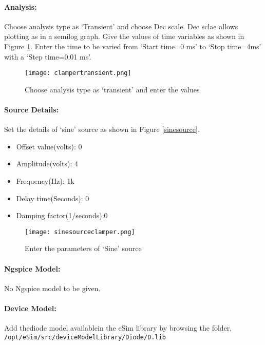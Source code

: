 %

\paragraph{Analysis:}Choose analysis type as `Transient' and choose Dec scale. Dec sclae allows plotting as in a semilog graph.  Give the values of time variables as shown in Figure \ref{clampertransient}. Enter the time to be varied from `Start time=0 ms' to `Stop time=4ms' with a `Step time=0.01 ms'.

\begin{figure}[h]
\centering
\texttt{[image: clampertransient.png]}
\caption{Choose analysis type as `transient' and enter the values}
\label{clampertransient}
\end{figure}

\paragraph{Source Details:} Set the details of `sine' source as shown in Figure \ref{sinesource}.
\begin{itemize}
\item
Offset value(volts): 0
\item
Amplitude(volts): 4
\item
Frequency(Hz): 1k
\item
Delay time(Seconds): 0
\item
Damping factor(1/seconds):0

\end{itemize}
\begin{figure}[h]
\centering
\texttt{[image: sinesourceclamper.png]}
\caption{Enter the parameters of `Sine' source}
\label{sinesourceclamper}
\end{figure}


\paragraph{Ngspice Model:} No Ngspice model to be given.

\paragraph{Device Model:} Add thediode model availablein the eSim library by browsing the folder, \texttt{/opt/eSim/src/deviceModelLibrary/Diode/D.lib}

